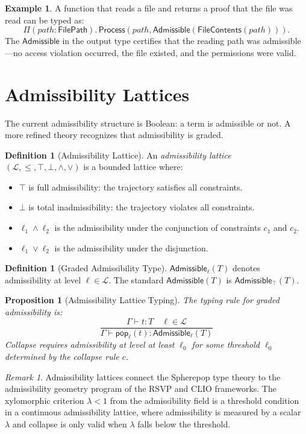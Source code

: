 \documentclass[12pt, a4paper, openany]{book}
\theoremstyle{plain}
\newtheorem{proposition}[theorem]{Proposition}
\theoremstyle{definition}
\newtheorem{definition}[theorem]{Definition}
\newtheorem{example}[theorem]{Example}
\theoremstyle{remark}
\newtheorem{remark}[theorem]{Remark}
\newcommand{\Adm}{\mathsf{Admissible}}
\newcommand{\Proc}{\mathsf{Process}}
\begin{document}
\begin{example}
A function that reads a file and returns a proof that the file was read can be
typed as:
\[
\Pi(\mathit{path} : \mathsf{FilePath}).\, \Proc(\mathit{path}, \Adm(\mathsf{FileContents}(\mathit{path}))).
\]
The $\Adm$ in the output type certifies that the reading path was admissible---no
access violation occurred, the file existed, and the permissions were valid.
\end{example}

\section{Admissibility Lattices}

The current admissibility structure is Boolean: a term is admissible or not. A
more refined theory recognizes that admissibility is graded.

\begin{definition}[Admissibility Lattice]
An \emph{admissibility lattice} $(\mathcal{L}, \leq, \top, \bot, \wedge, \vee)$
is a bounded lattice where:
\begin{itemize}
\item $\top$ is full admissibility: the trajectory satisfies all constraints.
\item $\bot$ is total inadmissibility: the trajectory violates all constraints.
\item $\ell_1 \wedge \ell_2$ is the admissibility under the conjunction of
constraints $c_1$ and $c_2$.
\item $\ell_1 \vee \ell_2$ is the admissibility under the disjunction.
\end{itemize}
\end{definition}

\begin{definition}[Graded Admissibility Type]
$\Adm_\ell(T)$ denotes admissibility at level $\ell \in \mathcal{L}$. The
standard $\Adm(T)$ is $\Adm_\top(T)$.
\end{definition}

\begin{proposition}[Admissibility Lattice Typing]
The typing rule for graded admissibility is:
\[
\frac{\Gamma \vdash t : T \quad \ell \in \mathcal{L}}{\Gamma \vdash \mathsf{pop}_\ell(t) : \Adm_\ell(T)}
\]
Collapse requires admissibility at level at least $\ell_0$ for some threshold
$\ell_0$ determined by the collapse rule $c$.
\end{proposition}

\begin{remark}
Admissibility lattices connect the Spherepop type theory to the admissibility
geometry program of the RSVP and CLIO frameworks. The xylomorphic criterion
$\lambda < 1$ from the admissibility field is a threshold condition in a
continuous admissibility lattice, where admissibility is measured by a scalar
$\lambda$ and collapse is only valid when $\lambda$ falls below the threshold.
\end{remark}
\end{document}
